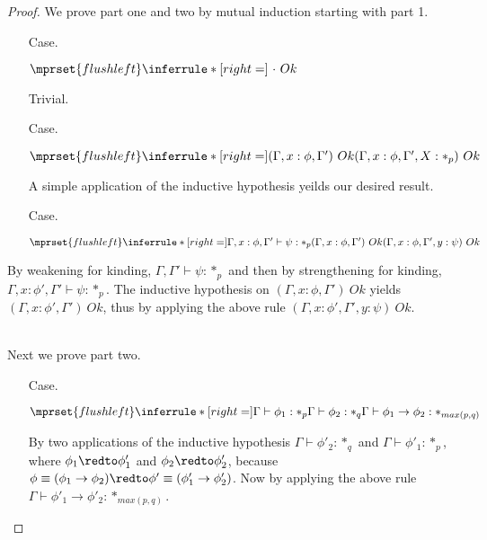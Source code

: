 \begin{proof}
  We prove part one and two by mutual induction starting with part 1.
\begin{itemize}
\item[Case.] \ \\
  \begin{center}
    \begin{math}
      $$\mprset{flushleft}
      \inferrule* [right=] {
        \   
      }{\cdot\ Ok}
    \end{math}
  \end{center}
  Trivial.

\item[Case.]\ \\
  \begin{center}
    \begin{math}
      $$\mprset{flushleft}
      \inferrule* [right=] {
        (\Gamma,x:\phi,\Gamma')\ Ok
      }{(\Gamma,x:\phi,\Gamma',X:*_p)\ Ok}
    \end{math}
  \end{center}
  A simple application of the inductive hypothesis yeilds our desired result.

\item[Case.]\ \\
  \begin{center}
    \begin{math}
      $$\mprset{flushleft}
      \inferrule* [right=] {
        \Gamma,x:\phi,\Gamma' \vdash \psi:*_p
        \\
        (\Gamma,x:\phi,\Gamma')\ Ok
      }{(\Gamma,x :\phi,\Gamma',y:\psi)\ Ok}
    \end{math} 
  \end{center}
\end{itemize}
By weakening for kinding, $\Gamma,\Gamma' \vdash \psi:*_p$ and then by strengthening for kinding, $\Gamma,x:\phi',\Gamma' \vdash \psi:*_p$.
The inductive hypothesis on $(\Gamma,x:\phi,\Gamma')\ Ok$ yields $(\Gamma,x:\phi',\Gamma')\ Ok$, thus by applying the above rule
$(\Gamma,x :\phi',\Gamma',y:\psi)\ Ok$.

\ \\
\noindent
Next we prove part two.
\begin{itemize}
\item[Case.] \ \\
  \begin{center}
    \begin{math}
      $$\mprset{flushleft}
      \inferrule* [right=] {
        \Gamma \vdash \phi_1 : *_p
        \\
        \Gamma \vdash \phi_2 : *_q
      }{\Gamma \vdash \phi_1 \rightarrow \phi_2 : *_{max(p,q)}}
    \end{math}
  \end{center}
  By two applications of the inductive hypothesis $\Gamma \vdash \phi'_2 : *_q$ and
  $\Gamma \vdash \phi'_1 : *_p$, where $\phi_1 \redto \phi'_1$ and $\phi_2 \redto \phi'_2$, because
  $\phi \equiv (\phi_1 \to \phi_2) \redto \phi' \equiv (\phi'_1 \to \phi'_2)$.  Now by applying
  the above rule $\Gamma \vdash \phi'_1 \to \phi'_2 : *_{max(p,q)}$. 


\end{itemize}
\end{proof}
